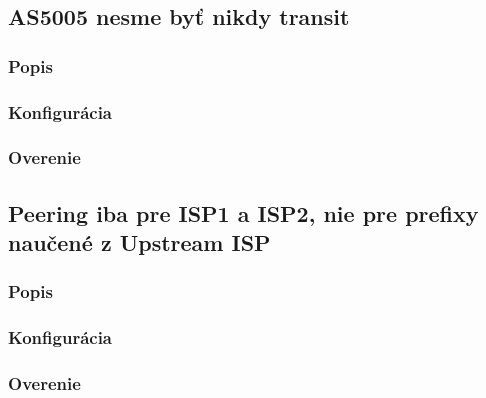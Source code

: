 \documentclass[12pt,twoside,a4paper]{report}
\begin{document}
\subsection{AS5005 nesme byť nikdy transit}
\subsubsection{Popis}
\paragraph{}

\subsubsection{Konfigurácia}
\paragraph{}

\subsubsection{Overenie}
\paragraph{}







\subsection{Peering iba pre ISP1 a ISP2, nie pre prefixy naučené z Upstream ISP}
\subsubsection{Popis}
\paragraph{}

\subsubsection{Konfigurácia}
\paragraph{}

\subsubsection{Overenie}
\end{document}
